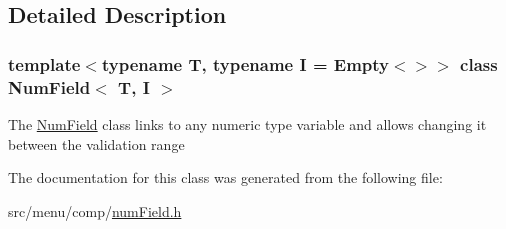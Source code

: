 \subsection{Detailed Description}
\subsubsection*{template$<$typename T, typename I = Empty$<$$>$$>$\newline
class Num\+Field$<$ T, I $>$}

The \hyperlink{classNumField}{Num\+Field} class links to any numeric type variable and allows changing it between the validation range 

The documentation for this class was generated from the following file\+:\begin{DoxyCompactItemize}
\item 
src/menu/comp/\hyperlink{numField_8h}{num\+Field.\+h}\end{DoxyCompactItemize}
